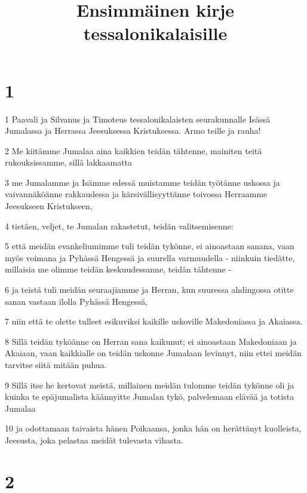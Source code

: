 

\title{Ensimmäinen kirje tessalonikalaisille}


\chapter{1}

\par 1 Paavali ja Silvanus ja Timoteus tessalonikalaisten seurakunnalle Isässä Jumalassa ja Herrassa Jeesuksessa Kristuksessa. Armo teille ja rauha!
\par 2 Me kiitämme Jumalaa aina kaikkien teidän tähtenne, mainiten teitä rukouksissamme, sillä lakkaamatta
\par 3 me Jumalamme ja Isämme edessä muistamme teidän työtänne uskossa ja vaivannäköänne rakkaudessa ja kärsivällisyyttänne toivossa Herraamme Jeesukseen Kristukseen,
\par 4 tietäen, veljet, te Jumalan rakastetut, teidän valitsemisenne:
\par 5 että meidän evankeliumimme tuli teidän tykönne, ei ainoastaan sanana, vaan myös voimana ja Pyhässä Hengessä ja suurella varmuudella - niinkuin tiedätte, millaisia me olimme teidän keskuudessanne, teidän tähtenne -
\par 6 ja teistä tuli meidän seuraajiamme ja Herran, kun suuressa ahdingossa otitte sanan vastaan ilolla Pyhässä Hengessä,
\par 7 niin että te olette tulleet esikuviksi kaikille uskoville Makedoniassa ja Akaiassa.
\par 8 Sillä teidän tyköänne on Herran sana kaikunut; ei ainoastaan Makedoniaan ja Akaiaan, vaan kaikkialle on teidän uskonne Jumalaan levinnyt, niin ettei meidän tarvitse siitä mitään puhua.
\par 9 Sillä itse he kertovat meistä, millainen meidän tulomme teidän tykönne oli ja kuinka te epäjumalista käännyitte Jumalan tykö, palvelemaan elävää ja totista Jumalaa
\par 10 ja odottamaan taivaista hänen Poikaansa, jonka hän on herättänyt kuolleista, Jeesusta, joka pelastaa meidät tulevasta vihasta.

\chapter{2}

